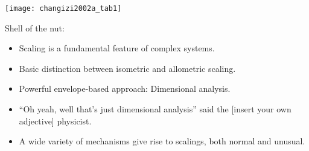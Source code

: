 \begin{frame}

  \begin{block}{}
    \texttt{[image: changizi2002a\_tab1]}
  \end{block}

\end{frame}

\begin{frame}

  \begin{block}{Shell of the nut:}
    \begin{itemize}
    \item<+->
      Scaling is a fundamental feature of complex systems.
    \item<+->
      Basic distinction between isometric and allometric scaling.
    \item<+->
      Powerful envelope-based approach: Dimensional analysis.
    \item<+->
      ``Oh yeah, well that's just dimensional analysis'' said the [insert
      your own adjective] physicist.
    \item<+->
      A wide variety of mechanisms give rise to scalings, 
      both normal and unusual.
    \end{itemize}
  \end{block}

\end{frame}

